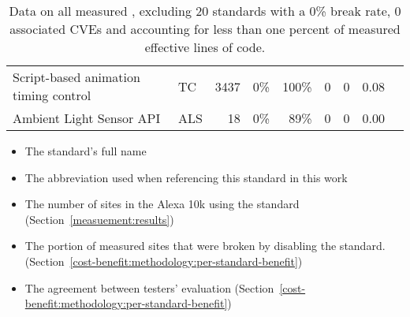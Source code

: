 \begin{table}[ht]
{\begin{tabular}{ l | l r r r | r r | r | l }
      Script-based animation timing control          &  TC          & 3437  & 0\%          & 100\% & 0   & 0  & 0.08  & \cite{nikiforakis2013cookieless} \\ %
      Ambient Light Sensor API                            &  ALS         & 18    & 0\%          & 89\%  & 0   & 0  & 0.00  & \cite{nikiforakis2013cookieless,olejnik2017stealing} \\ %
    \bottomrule
  \end{tabular}
  }
  \caption{
    Data on all \NumStandards measured \WASs, excluding 20 standards with a 0\% break rate, 0 associated CVEs
    and accounting for less than one percent of measured effective lines of code.
  }
  \begin{small}
    \begin{itemize}
      \setlength{\itemsep}{-2pt}
      \item The standard's full name
      \item The abbreviation used when referencing this standard in this work
      \item The number of sites in the Alexa 10k using the standard (Section~\ref{measuement:results})
      \item The portion of measured sites that were broken by disabling the
        standard. (Section~\ref{cost-benefit:methodology:per-standard-benefit})
      \item The agreement between testers' evaluation (Section~\ref{cost-benefit:methodology:per-standard-benefit})

\end{itemize}
\end{small}
\end{table}
